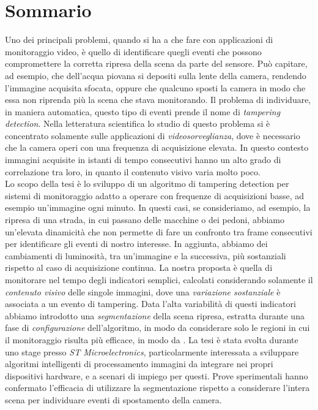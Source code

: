 \newpage
\chapter*{Sommario}


Uno dei principali problemi, quando si ha a che fare con applicazioni di monitoraggio video, \`e quello di identificare quegli eventi che possono compromettere la corretta ripresa della scena da parte del sensore.
Pu\`o capitare, ad esempio, che dell'acqua piovana si depositi sulla lente della camera, rendendo l'immagine acquisita sfocata, oppure che qualcuno sposti la camera in modo che essa non riprenda pi\`u la scena che stava monitorando.
Il problema di individuare, in maniera automatica, questo tipo di eventi prende il nome di \textit{tampering detection}. 
Nella letteratura scientifica lo studio di questo problema si \`e concentrato solamente sulle applicazioni di \textit{videosorveglianza}, dove \`e necessario che la camera operi con una frequenza di acquisizione elevata.
In questo contesto immagini acquisite in istanti di tempo consecutivi hanno un alto grado di correlazione tra loro, in quanto il contenuto visivo varia molto poco.\\
Lo scopo della tesi \`e lo sviluppo di un algoritmo di tampering detection per sistemi di monitoraggio  adatto a operare con frequenze di acquisizioni basse, ad esempio un'immagine ogni minuto.
In questi casi, se consideriamo, ad esempio, la ripresa di una strada, in cui passano delle macchine o dei pedoni, abbiamo un'elevata dinamicit\`a che non permette di fare un confronto tra frame consecutivi per identificare gli eventi di nostro interesse. In aggiunta, abbiamo dei cambiamenti di luminosit\`a, tra un'immagine e la successiva, pi\`u sostanziali rispetto al caso di acquisizione continua.  
La nostra proposta \`e quella di monitorare nel tempo degli indicatori semplici, calcolati considerando solamente il \textit{contenuto visivo} delle singole immagini, dove una \textit{variazione sostanziale} \`e associata a un evento di tampering. 
Data l'alta variabilit\`a di questi indicatori abbiamo introdotto una \textit{segmentazione} della scena ripresa, estratta durante una fase di \textit{configurazione} dell'algoritmo, in modo da considerare solo le regioni in cui il monitoraggio risulta pi\`u efficace, in modo da . 
La tesi \`e stata svolta durante uno stage presso \textit{ST Microelectronics}, particolarmente interessata a sviluppare algoritmi intelligenti di processamento immagini da integrare nei propri dispositivi hardware, e a scenari di impiego per questi.
Prove sperimentali hanno confermato l'efficacia di utilizzare la segmentazione rispetto a considerare l'intera scena per individuare eventi di spostamento della camera. 